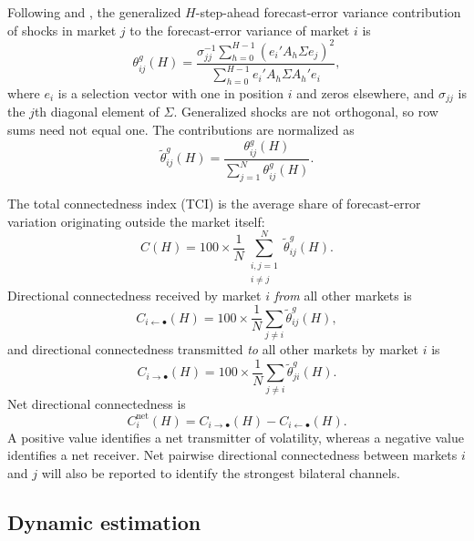 \documentclass[12pt,a4paper]{article}
\begin{document}
Following \citet{PesaranShin1998} and \citet{DieboldYilmaz2012}, the generalized $H$-step-ahead forecast-error variance contribution of shocks in market $j$ to the forecast-error variance of market $i$ is
\begin{equation}
 \theta_{ij}^{g}(H)=
 \frac{\sigma_{jj}^{-1}\sum_{h=0}^{H-1}
 \left(e_i'A_h\Sigma e_j\right)^2}
 {\sum_{h=0}^{H-1}e_i'A_h\Sigma A_h'e_i},
 \label{eq:gfevd}
\end{equation}
where $e_i$ is a selection vector with one in position $i$ and zeros elsewhere, and $\sigma_{jj}$ is the $j$th diagonal element of $\Sigma$. Generalized shocks are not orthogonal, so row sums need not equal one. The contributions are normalized as
\begin{equation}
 \widetilde{\theta}_{ij}^{g}(H)=
 \frac{\theta_{ij}^{g}(H)}{\sum_{j=1}^{N}\theta_{ij}^{g}(H)}.
 \label{eq:normalize}
\end{equation}

The total connectedness index (TCI) is the average share of forecast-error variation originating outside the market itself:
\begin{equation}
 C(H)=100\times\frac{1}{N}
 \sum_{\substack{i,j=1\\i\neq j}}^{N}
 \widetilde{\theta}_{ij}^{g}(H).
 \label{eq:tci}
\end{equation}
Directional connectedness received by market $i$ \emph{from} all other markets is
\begin{equation}
 C_{i\leftarrow\bullet}(H)=100\times
 \frac{1}{N}\sum_{j\neq i}\widetilde{\theta}_{ij}^{g}(H),
 \label{eq:from}
\end{equation}
and directional connectedness transmitted \emph{to} all other markets by market $i$ is
\begin{equation}
 C_{i\rightarrow\bullet}(H)=100\times
 \frac{1}{N}\sum_{j\neq i}\widetilde{\theta}_{ji}^{g}(H).
 \label{eq:to}
\end{equation}
Net directional connectedness is
\begin{equation}
 C_i^{\mathrm{net}}(H)=C_{i\rightarrow\bullet}(H)-C_{i\leftarrow\bullet}(H).
 \label{eq:net}
\end{equation}
A positive value identifies a net transmitter of volatility, whereas a negative value identifies a net receiver. Net pairwise directional connectedness between markets $i$ and $j$ will also be reported to identify the strongest bilateral channels.

\subsection{Dynamic estimation}
\end{document}
